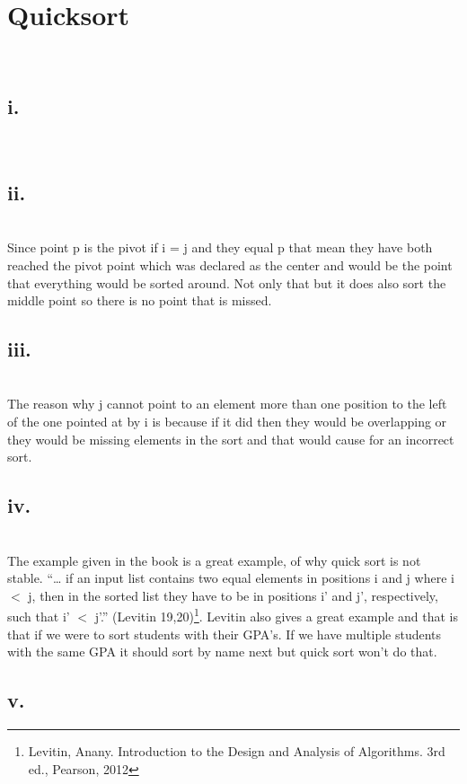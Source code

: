 \documentclass[12pt]{amsart}
\begin{document}
\pagebreak

\section{Quicksort}
\leavevmode \\
\subsection{i.}
\leavevmode \\

\subsection{ii.}
\leavevmode \\
Since point p is the pivot if i = j and they equal p that mean they have both reached the pivot point which was declared as the center and would be the point that everything would be sorted around. Not only that but it does also sort the middle point so there is no point that is missed.

\subsection{iii.}
\leavevmode \\
The reason why j cannot point to an element more than one position to the left of the one pointed at by i is because if it did then they would be overlapping or they would be missing elements in the sort and that would cause for an incorrect sort. 

\subsection{iv.}
\leavevmode \\
The example given in the book is a great example, of why quick sort is not stable. “… if an input list contains two equal elements in positions i and j where i $<$ j, then in the sorted list they have to be in positions i’ and j’, respectively, such that i’ $<$ j’.” (Levitin 19,20)\footnote{Levitin, Anany. Introduction to the Design and Analysis of Algorithms. 3rd ed., Pearson, 2012}. Levitin also gives a great example and that is that if we were to sort students with their GPA’s. If we have multiple students with the same GPA it should sort by name next but quick sort won’t do that.

\subsection{v.}
\end{document}
